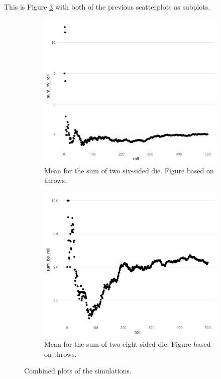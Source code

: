 \documentclass[12pt]{article}
\theoremstyle{definition}
\begin{document}
\newpage

This is Figure \ref{fig:figsubplots2} with both of the previous scatterplots as subplots. 
\begin{figure}[tbh!]
\begin{subfigure}{.5\textwidth}
  \centering
  \includegraphics[width=0.8\linewidth]{plot/baseline/lln_plot_baseline.png}  
  \caption{Mean for the sum of two six-sided die. Figure based on throws.}
  \label{fig:sub-first2}
\end{subfigure}
\begin{subfigure}{.5\textwidth}
  \centering
  \includegraphics[width=0.8\linewidth]{plot/500_8/lln_plot_500_8.png}  
  \caption{Mean for the sum of two eight-sided die. Figure based on throws.}
  \label{fig:sub-second2}
\end{subfigure}
\caption{Combined plots of the simulations.}
\label{fig:figsubplots2}
\end{figure} \\[12pt] 
\end{document}

